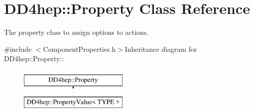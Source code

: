 \hypertarget{class_d_d4hep_1_1_property}{
\section{DD4hep::Property Class Reference}
\label{class_d_d4hep_1_1_property}
}


The property class to assign options to actions.  


{\ttfamily \#include $<$ComponentProperties.h$>$}Inheritance diagram for DD4hep::Property::\begin{figure}[H]
\begin{center}
\leavevmode
\includegraphics[height=2cm]{class_d_d4hep_1_1_property}
\end{center}
\end{figure}
